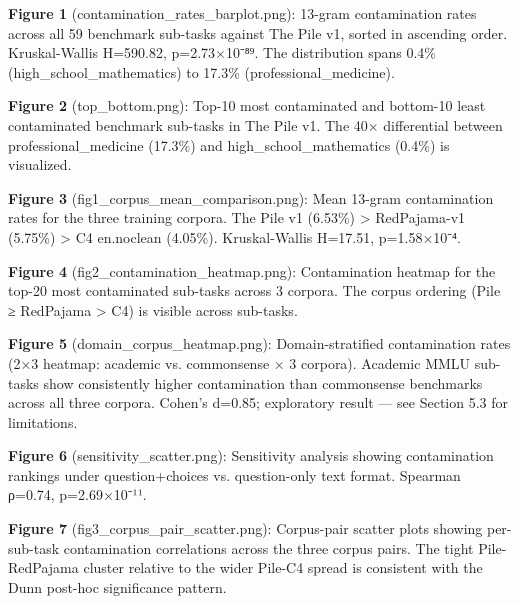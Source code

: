 
\textbf{Figure 1} (contamination_rates_barplot.png): 13-gram contamination rates across all 59 benchmark sub-tasks against The Pile v1, sorted in ascending order. Kruskal-Wallis H=590.82, p=2.73×10⁻⁸⁹. The distribution spans 0.4\% (high_school_mathematics) to 17.3\% (professional_medicine).

\textbf{Figure 2} (top_bottom.png): Top-10 most contaminated and bottom-10 least contaminated benchmark sub-tasks in The Pile v1. The 40× differential between professional_medicine (17.3\%) and high_school_mathematics (0.4\%) is visualized.

\textbf{Figure 3} (fig1_corpus_mean_comparison.png): Mean 13-gram contamination rates for the three training corpora. The Pile v1 (6.53\%) > RedPajama-v1 (5.75\%) > C4 en.noclean (4.05\%). Kruskal-Wallis H=17.51, p=1.58×10⁻⁴.

\textbf{Figure 4} (fig2_contamination_heatmap.png): Contamination heatmap for the top-20 most contaminated sub-tasks across 3 corpora. The corpus ordering (Pile ≥ RedPajama > C4) is visible across sub-tasks.

\textbf{Figure 5} (domain_corpus_heatmap.png): Domain-stratified contamination rates (2×3 heatmap: academic vs. commonsense × 3 corpora). Academic MMLU sub-tasks show consistently higher contamination than commonsense benchmarks across all three corpora. Cohen's d=0.85; exploratory result — see Section 5.3 for limitations.

\textbf{Figure 6} (sensitivity_scatter.png): Sensitivity analysis showing contamination rankings under question+choices vs. question-only text format. Spearman ρ=0.74, p=2.69×10⁻¹¹.

\textbf{Figure 7} (fig3_corpus_pair_scatter.png): Corpus-pair scatter plots showing per-sub-task contamination correlations across the three corpus pairs. The tight Pile-RedPajama cluster relative to the wider Pile-C4 spread is consistent with the Dunn post-hoc significance pattern.

